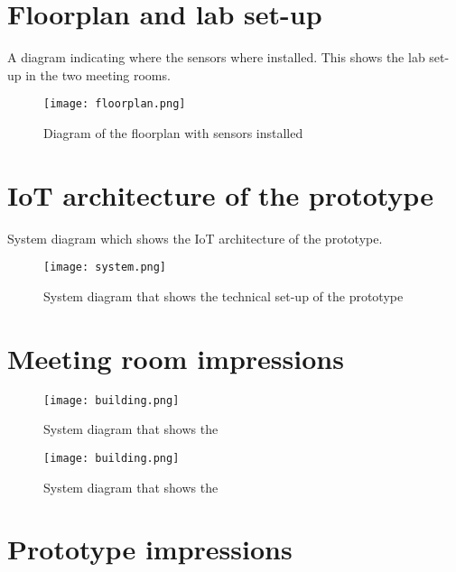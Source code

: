 \begin{appendices}
\pagebreak

\section{Floorplan and lab set-up}
\label{sec:apx:first_appendix}

A diagram indicating where the sensors where installed. This shows the lab set-up in the two meeting rooms.

\begin{figure}[H]
    \centering
    \texttt{[image: floorplan.png]}
    \caption{Diagram of the floorplan with sensors installed}
    \label{fig:timeline}
\end{figure}

\section{IoT architecture of the prototype}
\label{sec:apx:first_appendix}

System diagram which shows the IoT architecture of the prototype.

\begin{figure}[H]
    \centering
    \texttt{[image: system.png]}
    \caption{System diagram that shows the technical set-up of the prototype}
    \label{fig:timeline}
\end{figure}

\pagebreak

\section{Meeting room impressions}
\label{sec:apx:first_appendix}

\begin{figure}[H]
\begin{minipage}{.5\textwidth}
    \centering
    \texttt{[image: building.png]}
    \caption{System diagram that shows the }
    \label{fig:timeline}
\end{minipage}%
\begin{minipage}{.5\textwidth}
    \centering
    \texttt{[image: building.png]}
    \caption{System diagram that shows the }
    \label{fig:timeline}
\end{minipage}%
\end{figure}

\section{Prototype impressions}
\label{sec:apx:first_appendix}


\end{appendices}
